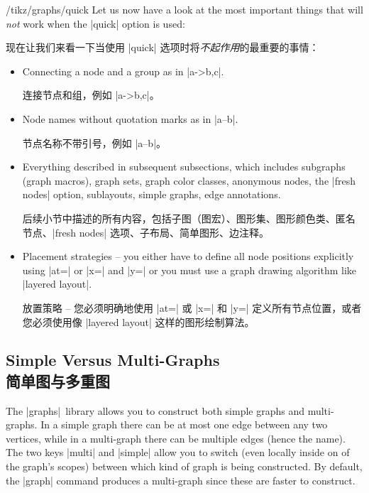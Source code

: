 \begin{key}{/tikz/graphs/quick}
    Let us now have a look at the most important things that will \emph{not}
    work when the |quick| option is used:

    现在让我们来看一下当使用 |quick| 选项时将\emph{不起作用}的最重要的事情：

    \begin{itemize}
        \item Connecting a node and a group as in |a->{b,c}|.

        连接节点和组，例如 |a->{b,c}|。

        \item Node names without quotation marks as in |a--b|.

        节点名称不带引号，例如 |a--b|。


        \item Everything described in subsequent subsections, which includes
            subgraphs (graph macros), graph sets, graph color classes,
            anonymous nodes, the |fresh nodes| option, sublayouts, simple
            graphs, edge annotations.

            后续小节中描述的所有内容，包括子图（图宏）、图形集、图形颜色类、匿名节点、|fresh nodes| 选项、子布局、简单图形、边注释。


        \item Placement strategies -- you either have to define all node
            positions explicitly using |at=| or |x=| and |y=| or you must use a
            graph drawing algorithm like |layered layout|.

            放置策略 -- 您必须明确地使用 |at=| 或 |x=| 和 |y=| 定义所有节点位置，或者您必须使用像 |layered layout| 这样的图形绘制算法。


    \end{itemize}
\end{key}


\subsection{Simple Versus Multi-Graphs\\简单图与多重图}
\label{section-library-graphs-simple}

The |graphs| library allows you to construct both simple graphs and
multi-graphs. In a simple graph there can be at most one edge between any two
vertices, while in a multi-graph there can be multiple edges (hence the name).
The two keys |multi| and |simple| allow you to switch (even locally inside on
of the graph's scopes) between which kind of graph is being constructed. By
default, the |graph| command produces a multi-graph since these are faster to
construct.


